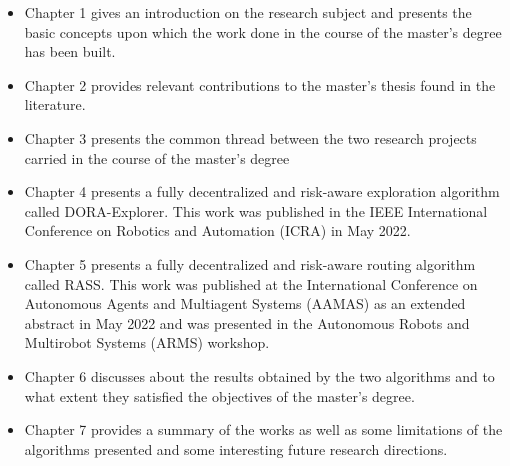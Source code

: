 \begin{itemize}
    \item Chapter 1 gives an introduction on the research subject and presents the basic concepts upon which the work done in the course of the master's degree has been built. 
    \item Chapter 2 provides relevant contributions to the master's thesis found in the literature.
    \item Chapter 3 presents the common thread between the two research projects carried in the course of the master's degree
    \item Chapter 4 presents a fully decentralized and risk-aware exploration algorithm called DORA-Explorer. This work was published in the IEEE International Conference on Robotics and Automation (ICRA) in May 2022.
    \item Chapter 5 presents a fully decentralized and risk-aware routing algorithm called RASS. This work was published at the International Conference on Autonomous Agents and Multiagent Systems (AAMAS) as an extended abstract in May 2022 and was presented in the Autonomous Robots and Multirobot Systems (ARMS) workshop. 
    \item Chapter 6 discusses about the results obtained by the two algorithms and to what extent they satisfied the objectives of the master's degree. 
    \item Chapter 7 provides a summary of the works as well as some limitations of the algorithms presented and some interesting future research directions.
\end{itemize}

